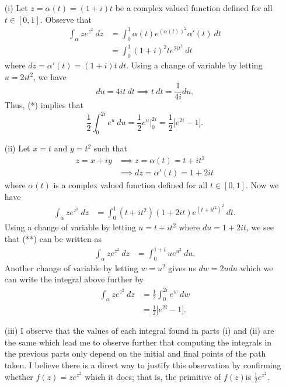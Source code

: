 \documentclass[a4paper]{article}
\begin{document}
\begin{solution}
\begin{enumerate}
    \item[(i)] Let \( z = \alpha(t) = (1+i)t \) be a complex valued function defined for all \( t \in [0,1] \). Observe that   
        \begin{align*}
            \int_{ \alpha }^{  }  z e^{z^{2}}  \ dz &= \int_{ 0 }^{ 1 }  \alpha(t) e^{(\alpha(t))^{2}} \alpha'(t) \ dt \\
                                                    &= \int_{ 0 }^{ 1 }  (1+i)^{2} t e^{2i t^{2}} \ dt
        \end{align*}
        where \( dz = \alpha'(t) = (1+i) t \ dt \). Using a change of variable by letting \( u = 2i t^{2} \), we have 
        \[  du = 4i t \ dt \implies t \ dt = \frac{ 1 }{ 4i } du. \tag{*} \]
        Thus, (*) implies that 
        \[  \frac{ 1 }{ 2 }  \int_{ 0  }^{ 2i }  e^{u} \ du = \frac{ 1 }{ 2 }  e^{u}  \Big|_{0}^{2i} = \frac{ 1 }{ 2 }  \Big[ e^{2i} -  1 \Big]. \]
    \item[(ii)] Let \( x = t \) and \( y = t^{2} \) such that 
        \begin{align*}
        z = x + iy &\implies z = \alpha(t) = t + i t^{2} \\
                   &\implies dz = \alpha'(t) = 1 + 2it
    \end{align*}
    where \( \alpha(t) \) is a complex valued function defined for all \( t \in [0,1] \).
    Now we have
    \begin{align*}
        \int_{ \alpha }^{  } z e^{z^{2}}  \ dz &= \int_{ 0 }^{ 1 }  (t+ i t^{2})(1+2it) e^{(t + i t^{2})^{2}} \ dt. \tag{**}
    \end{align*}
    Using a change of variable by letting \( u = t + i t^{2} \) where \( du = 1 + 2it \), we see that (**) can be written as
    \begin{align*}
        \int_{ \alpha }^{  } z e^{z^{2}} \ dz &= \int_{ 0 }^{ 1 + i } u e^{u^{2}} \ du.
    \end{align*}
    Another change of variable by letting \( w =  u^{2} \) gives us \( dw = 2u du \) which we can write the integral above further by
    \begin{align*}
        \int_{ \alpha }^{  } z e^{z^{2}} \ dz &= \frac{ 1 }{ 2 } \int_{ 0 }^{ 2i }  e^{w} \ dw \\
                                              &= \frac{ 1 }{ 2 } \Big[ e^{2i} -  1 \Big].  
    \end{align*}
\item[(iii)] I observe that the values of each integral found in parts (i) and (ii) are the same which lead me to observe further that computing the integrals in the previous parts only depend on the initial and final points of the path taken. I believe there is a direct way to justify this observation by confirming whether \( f(z) =  z e^{z^{2}} \) which it does; that is, the primitive of \( f(z)   \)is \( \frac{ 1 }{ 2 }  e^{z^{2}} \).
\end{enumerate}
\end{solution}
\end{document}
